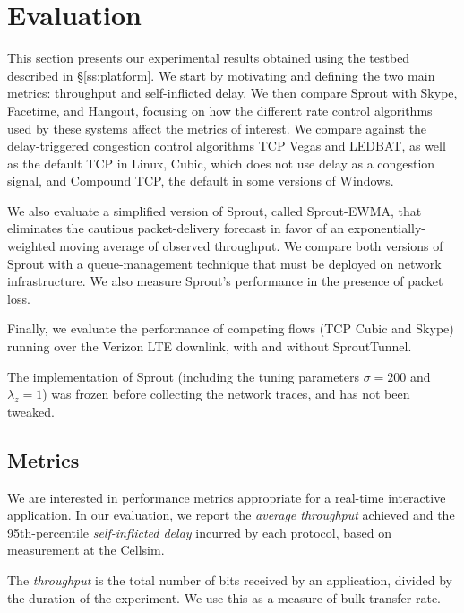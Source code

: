 \section{Evaluation}
\label{sprout:eval}

This section presents our experimental results obtained using the
testbed described
in \S\ref{ss:platform}. We start by motivating and defining the two
main metrics: throughput and self-inflicted delay. We then compare
Sprout with Skype, Facetime, and Hangout, focusing on how the
different rate control algorithms used by these systems affect the
metrics of interest. We compare against the delay-triggered congestion
control algorithms TCP Vegas and LEDBAT, as well as the
default TCP in Linux, Cubic, which does not use delay as a
congestion signal, and Compound TCP, the default in some
versions of Windows.

We also evaluate a simplified version of Sprout, called Sprout-EWMA,
that eliminates the cautious packet-delivery forecast in favor of an
exponentially-weighted moving average of observed throughput. We
compare both versions of Sprout with a queue-management technique that
must be deployed on network infrastructure. We also measure Sprout's
performance in the presence of packet loss.

Finally, we evaluate the performance of competing flows (TCP Cubic
and Skype) running over the Verizon LTE downlink, with and without
SproutTunnel.

The implementation of Sprout (including the tuning parameters $\sigma
= 200$ and $\lambda_z = 1$) was frozen before collecting the network
traces, and has not been tweaked.

\subsection{Metrics}

We are interested in performance metrics appropriate for a real-time
interactive application. In our evaluation, we report the
\emph{average throughput} achieved and the 95th-percentile
\emph{self-inflicted delay} incurred by each protocol, based on
measurement at the Cellsim.

The \emph{throughput} is the total number of bits received by an
application, divided by the duration of the experiment. We use this as
a measure of bulk transfer rate.

